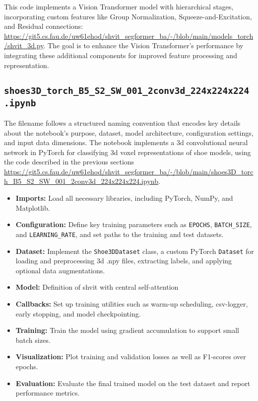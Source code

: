 This code implements a Vision Transformer model with hierarchical stages, incorporating custom features like Group Normalization, Squeeze-and-Excitation, and Residual connections: \url{https://git5.cs.fau.de/uw61ehod/shvit_segformer_ba/-/blob/main/models_torch/shvit_3d.py}. The goal is to enhance the Vision Transformer's performance by integrating these additional components for improved feature processing and representation.


\subsection{{\tt shoes3D\_torch\_B5\_S2\_SW\_001\_2conv3d\_224x224x224.ipynb}} \label{sec::standard'odell_nb}
The filename follows a structured naming convention that encodes key details about the notebook’s purpose, dataset, model architecture, configuration settings, and input data dimensions. The notebook implements a \gls{3d} convolutional neural network in PyTorch for classifying \gls{3d} voxel representations of shoe models, using the code described in the previous sections \url{https://git5.cs.fau.de/uw61ehod/shvit_segformer_ba/-/blob/main/shoes3D_torch_B5_S2_SW_001_2conv3d_224x224x224.ipynb}.

\begin{itemize}
	\item \textbf{Imports:} Load all necessary libraries, including PyTorch, NumPy, and Matplotlib.
	\item \textbf{Configuration:} Define key training parameters such as {\tt EPOCHS}, {\tt BATCH\_SIZE}, and {\tt LEARNING\_RATE}, and set paths to the training and test datasets.
	\item \textbf{Dataset:} Implement the {\tt Shoe3DDataset} class, a custom PyTorch {\tt Dataset} for loading and preprocessing \gls{3d} .npy files, extracting labels, and applying optional data augmentations.
	\item \textbf{Model:} Definition of \gls{shvit} with central self-attention
	\item \textbf{Callbacks:} Set up training utilities such as warm-up scheduling, csv-logger, early stopping, and model checkpointing.
	\item \textbf{Training:} Train the model using gradient accumulation to support small batch sizes.
	\item \textbf{Visualization:} Plot training and validation losses as well as F1-scores over epochs.
	\item \textbf{Evaluation:} Evaluate the final trained model on the test dataset and report performance metrics.
\end{itemize}


